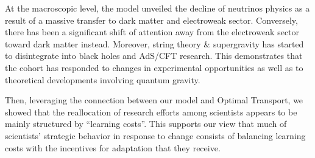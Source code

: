\documentclass{article}
\begin{document}




At the macroscopic level, the model unveiled the decline of neutrinos physics as a result of a massive transfer to dark matter and electroweak sector. Conversely, there has been a significant shift of attention away from the electroweak sector toward dark matter instead. Moreover, string theory \& supergravity has started to disintegrate into black holes and AdS/CFT research. This demonstrates that the cohort has responded to changes in experimental opportunities as well as to theoretical developments involving quantum gravity.

Then, leveraging the connection between our model and Optimal Transport, we showed that the reallocation of research efforts among scientists appears to be mainly structured by ``learning costs''. This supports our view that much of scientists' strategic behavior in response to change consists of balancing learning costs with the incentives for adaptation that they receive.
\end{document}
